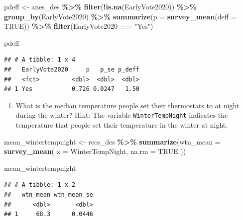 \documentclass[
]{krantz}
\makeatletter
\newenvironment{Shaded}{\begin{snugshade}}{\end{snugshade}}
\newcommand{\AttributeTok}[1]{\textcolor[rgb]{0.27,0.27,0.27}{#1}}
\newcommand{\ConstantTok}[1]{\textcolor[rgb]{0.37,0.37,0.37}{#1}}
\newcommand{\FunctionTok}[1]{\textcolor[rgb]{0.27,0.27,0.27}{\textbf{#1}}}
\newcommand{\NormalTok}[1]{#1}
\newcommand{\OtherTok}[1]{\textcolor[rgb]{0.37,0.37,0.37}{#1}}
\newcommand{\SpecialCharTok}[1]{\textcolor[rgb]{0.43,0.43,0.43}{\textbf{#1}}}
\newcommand{\StringTok}[1]{\textcolor[rgb]{0.5,0.5,0.5}{#1}}
\providecommand{\tightlist}{%
  \setlength{\itemsep}{0pt}\setlength{\parskip}{0pt}}
\newenvironment{kframe}{%
\medskip{}
\setlength{\fboxsep}{.8em}
 \def\at@end@of@kframe{}%
 \ifinner\ifhmode%
  \def\at@end@of@kframe{\end{minipage}}%
  \begin{minipage}{\columnwidth}%
 \fi\fi%
 \def\FrameCommand##1{\hskip\@totalleftmargin \hskip-\fboxsep
 \colorbox{shadecolor}{##1}\hskip-\fboxsep
     \hskip-\linewidth \hskip-\@totalleftmargin \hskip\columnwidth}%
 \MakeFramed {\advance\hsize-\width
   \@totalleftmargin\z@ \linewidth\hsize
   \@setminipage}}%
 {\par\unskip\endMakeFramed%
 \at@end@of@kframe}
\renewenvironment{Shaded}{\begin{kframe}}{\end{kframe}}
\makeatother
\begin{document}
\begin{Shaded}
\begin{Highlighting}[]
\NormalTok{pdeff }\OtherTok{\textless{}{-}}\NormalTok{ anes\_des }\SpecialCharTok{\%\textgreater{}\%}
  \FunctionTok{filter}\NormalTok{(}\SpecialCharTok{!}\FunctionTok{is.na}\NormalTok{(EarlyVote2020)) }\SpecialCharTok{\%\textgreater{}\%}
  \FunctionTok{group\_by}\NormalTok{(EarlyVote2020) }\SpecialCharTok{\%\textgreater{}\%}
  \FunctionTok{summarize}\NormalTok{(}\AttributeTok{p =} \FunctionTok{survey\_mean}\NormalTok{(}\AttributeTok{deff =} \ConstantTok{TRUE}\NormalTok{)) }\SpecialCharTok{\%\textgreater{}\%}
  \FunctionTok{filter}\NormalTok{(EarlyVote2020 }\SpecialCharTok{==} \StringTok{"Yes"}\NormalTok{)}

\NormalTok{pdeff}
\end{Highlighting}
\end{Shaded}

\begin{verbatim}
## # A tibble: 1 x 4
##   EarlyVote2020     p   p_se p_deff
##   <fct>         <dbl>  <dbl>  <dbl>
## 1 Yes           0.726 0.0247   1.50
\end{verbatim}

\begin{enumerate}
\def\labelenumi{\arabic{enumi}.}
\setcounter{enumi}{5}
\tightlist
\item
  What is the median temperature people set their thermostats to at night during the winter? Hint: The variable \texttt{WinterTempNight} indicates the temperature that people set their temperature in the winter at night.
\end{enumerate}

\begin{Shaded}
\begin{Highlighting}[]
\NormalTok{mean\_wintertempnight }\OtherTok{\textless{}{-}}\NormalTok{ recs\_des }\SpecialCharTok{\%\textgreater{}\%}
  \FunctionTok{summarize}\NormalTok{(}\AttributeTok{wtn\_mean =} \FunctionTok{survey\_mean}\NormalTok{(}
    \AttributeTok{x =}\NormalTok{ WinterTempNight,}
    \AttributeTok{na.rm =} \ConstantTok{TRUE}
\NormalTok{  ))}

\NormalTok{mean\_wintertempnight}
\end{Highlighting}
\end{Shaded}

\begin{verbatim}
## # A tibble: 1 x 2
##   wtn_mean wtn_mean_se
##      <dbl>       <dbl>
## 1     68.3      0.0446
\end{verbatim}
\end{document}
